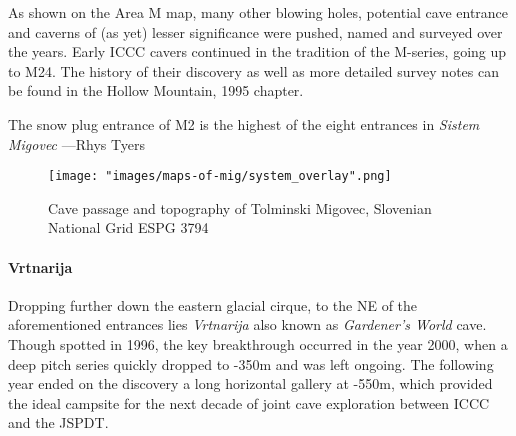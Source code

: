 As shown on the Area M map, many other blowing holes, potential cave entrance and caverns of (as yet) lesser significance were pushed, named and surveyed over the years. Early ICCC cavers continued in the tradition of the M-series, going up to M24. The history of their discovery as well as more detailed survey notes can be found in the Hollow Mountain, 1995 chapter.

\begin{marginfigure}
\checkoddpage \ifoddpage \forcerectofloat \else \forceversofloat \fi
\centering
 \caption{The snow plug entrance of M2 is the highest of the eight entrances in \emph{Sistem Migovec} ---Rhys Tyers}
 \label{surfaceM16}
\end{marginfigure}





 \begin{figure*}[t!]
 \checkoddpage \ifoddpage \forcerectofloat \else \forceversofloat \fi
\centering
  \texttt{[image: "images/maps-of-mig/system\_overlay".png]}
  \label{map m}
  \caption{Cave passage and topography of Tolminski Migovec, Slovenian National Grid ESPG 3794}
 \end{figure*}
\paragraph{Vrtnarija} Dropping further down the eastern glacial cirque, to the NE of the aforementioned entrances lies \emph{Vrtnarija} also known as  \emph{Gardener's World} cave. Though spotted in 1996, the key breakthrough occurred in the year 2000, when a deep pitch series quickly dropped to -350m and was left ongoing. The following year ended on the discovery a long horizontal gallery at -550m, which provided the ideal campsite for the next decade of joint cave exploration between ICCC and the JSPDT.

